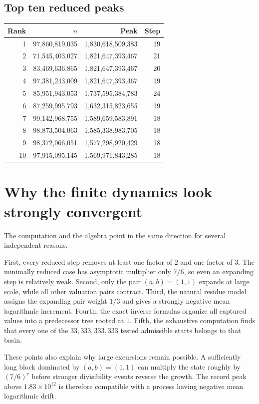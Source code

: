 \documentclass[11pt]{article}
\begin{document}
\subsection{Top ten reduced peaks}
\begin{center}\small
\begin{tabular}{rrrr}
\toprule
Rank & $n$ & Peak & Step\\\midrule
1&97,860,819,035&1,830,618,509,383&19\\
2&71,545,403,027&1,821,647,393,467&21\\
3&83,469,636,865&1,821,647,393,467&20\\
4&97,381,243,009&1,821,647,393,467&19\\
5&85,951,943,053&1,737,595,384,783&24\\
6&87,259,995,793&1,632,315,823,655&19\\
7&99,142,968,755&1,589,659,583,891&18\\
8&98,873,504,063&1,585,338,983,705&18\\
9&98,372,066,051&1,577,298,920,429&18\\
10&97,915,095,145&1,569,971,843,285&18\\
\bottomrule
\end{tabular}
\end{center}

\section{Why the finite dynamics look strongly convergent}
The computation and the algebra point in the same direction for several independent reasons.

First, every reduced step removes at least one factor of $2$ and one factor of $3$. The minimally reduced case has asymptotic multiplier only $7/6$, so even an expanding step is relatively weak. Second, only the pair $(a,b)=(1,1)$ expands at large scale, while all other valuation pairs contract. Third, the natural residue model assigns the expanding pair weight $1/3$ and gives a strongly negative mean logarithmic increment. Fourth, the exact inverse formulas organize all captured values into a predecessor tree rooted at $1$. Fifth, the exhaustive computation finds that every one of the $33,333,333,333$ tested admissible starts belongs to that basin.

These points also explain why large excursions remain possible. A sufficiently long block dominated by $(a,b)=(1,1)$ can multiply the state roughly by $(7/6)^r$ before stronger divisibility events reverse the growth. The record peak above $1.83\times10^{12}$ is therefore compatible with a process having negative mean logarithmic drift.
\end{document}
